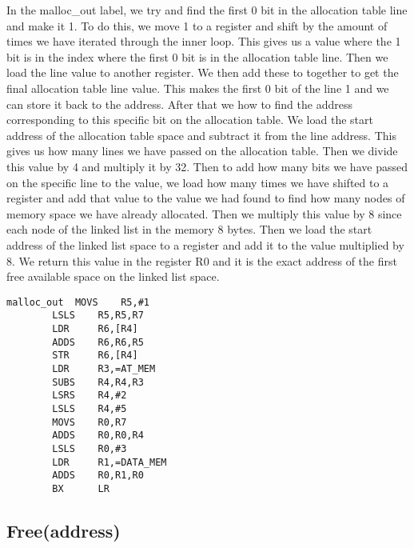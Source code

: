 \documentclass[pdftex,12pt,a4paper]{article}
\begin{document}
\pagebreak


In the malloc\_out label, we try and find the first 0 bit in the allocation table line and make it 1. To do this, we move 1 to a register and shift by the amount of times we have iterated through the inner loop. This gives us a value where the 1 bit is in the index where the first 0 bit is in the allocation table line. Then we load the line value to another register. We then add these to together to get the final allocation table line value. This makes the first 0 bit of the line 1 and we can store it back to the address. After that we how to find the address corresponding to this specific bit on the allocation table. We load the start address of the allocation table space and subtract it from the line address. This gives us how many lines we have passed on the allocation table. Then we divide this value by 4 and multiply it by 32. Then to add how many bits we have passed on the specific line to the value, we load how many times we have shifted to a register and add that value to the value we had found to find how many nodes of memory space we have already allocated. Then we multiply this value by 8 since each node of the linked list in the memory 8 bytes. Then we load the start address of the linked list space to a register and add it to the value multiplied by 8. We return this value in the register R0 and it is the exact address of the first free available space on the linked list space. 

\begin{lstlisting}
malloc_out	MOVS    R5,#1						
		LSLS    R5,R5,R7					
		LDR     R6,[R4]						
		ADDS    R6,R6,R5    				
		STR     R6,[R4]						
		LDR     R3,=AT_MEM					
		SUBS    R4,R4,R3					
		LSRS    R4,#2							
		LSLS    R4,#5						
		MOVS    R0,R7						
		ADDS    R0,R0,R4					
		LSLS    R0,#3							
		LDR     R1,=DATA_MEM					
		ADDS    R0,R1,R0					
		BX      LR
\end{lstlisting}

\pagebreak


\subsection{Free(address)}
\end{document}
